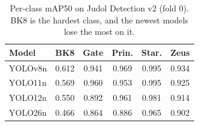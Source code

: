 \begin{table}[t]
\caption{Per-class mAP50 on Judol Detection v2 (fold 0). BK8 is the hardest class, and the newest models lose the most on it.}
\label{tab:perclass}
\centering\footnotesize\renewcommand{\arraystretch}{1.3}\setlength{\tabcolsep}{4pt}
\begin{tabular}{@{}lccccc@{}}
\toprule
\textbf{Model} & \textbf{BK8} & \textbf{Gate} & \textbf{Prin.} & \textbf{Star.} & \textbf{Zeus} \\
\midrule
YOLOv8n & 0.612 & 0.941 & 0.969 & 0.995 & 0.934 \\
YOLO11n & 0.569 & 0.960 & 0.953 & 0.995 & 0.925 \\
YOLO12n & 0.550 & 0.892 & 0.961 & 0.981 & 0.914 \\
YOLO26n & 0.466 & 0.864 & 0.886 & 0.965 & 0.902 \\
\bottomrule
\end{tabular}
\end{table}
